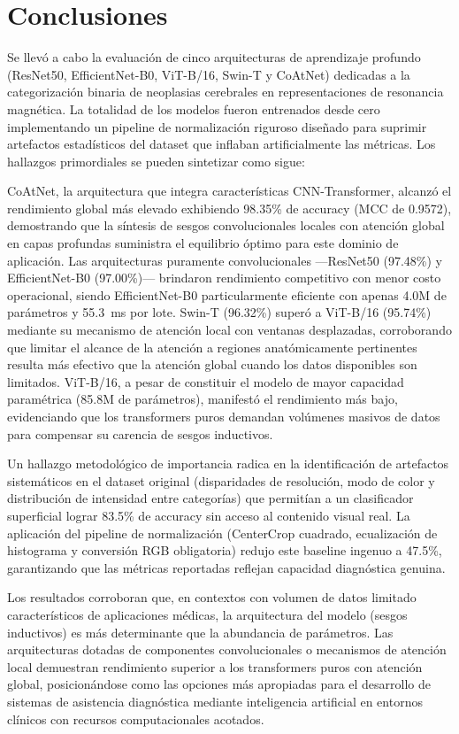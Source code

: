 \section{Conclusiones}
\label{sec:conclusions}

Se llevó a cabo la evaluación de cinco arquitecturas de aprendizaje profundo (ResNet50, EfficientNet-B0, ViT-B/16, Swin-T y CoAtNet) dedicadas a la categorización binaria de neoplasias cerebrales en representaciones de resonancia magnética. La totalidad de los modelos fueron entrenados desde cero implementando un pipeline de normalización riguroso diseñado para suprimir artefactos estadísticos del dataset que inflaban artificialmente las métricas. Los hallazgos primordiales se pueden sintetizar como sigue:

CoAtNet, la arquitectura que integra características CNN-Transformer, alcanzó el rendimiento global más elevado exhibiendo 98.35\% de accuracy (MCC de 0.9572), demostrando que la síntesis de sesgos convolucionales locales con atención global en capas profundas suministra el equilibrio óptimo para este dominio de aplicación. Las arquitecturas puramente convolucionales —ResNet50 (97.48\%) y EfficientNet-B0 (97.00\%)— brindaron rendimiento competitivo con menor costo operacional, siendo EfficientNet-B0 particularmente eficiente con apenas 4.0M de parámetros y 55.3~ms por lote. Swin-T (96.32\%) superó a ViT-B/16 (95.74\%) mediante su mecanismo de atención local con ventanas desplazadas, corroborando que limitar el alcance de la atención a regiones anatómicamente pertinentes resulta más efectivo que la atención global cuando los datos disponibles son limitados. ViT-B/16, a pesar de constituir el modelo de mayor capacidad paramétrica (85.8M de parámetros), manifestó el rendimiento más bajo, evidenciando que los transformers puros demandan volúmenes masivos de datos para compensar su carencia de sesgos inductivos.

Un hallazgo metodológico de importancia radica en la identificación de artefactos sistemáticos en el dataset original (disparidades de resolución, modo de color y distribución de intensidad entre categorías) que permitían a un clasificador superficial lograr 83.5\% de accuracy sin acceso al contenido visual real. La aplicación del pipeline de normalización (CenterCrop cuadrado, ecualización de histograma y conversión RGB obligatoria) redujo este baseline ingenuo a 47.5\%, garantizando que las métricas reportadas reflejan capacidad diagnóstica genuina.

Los resultados corroboran que, en contextos con volumen de datos limitado característicos de aplicaciones médicas, la arquitectura del modelo (sesgos inductivos) es más determinante que la abundancia de parámetros. Las arquitecturas dotadas de componentes convolucionales o mecanismos de atención local demuestran rendimiento superior a los transformers puros con atención global, posicionándose como las opciones más apropiadas para el desarrollo de sistemas de asistencia diagnóstica mediante inteligencia artificial en entornos clínicos con recursos computacionales acotados.
